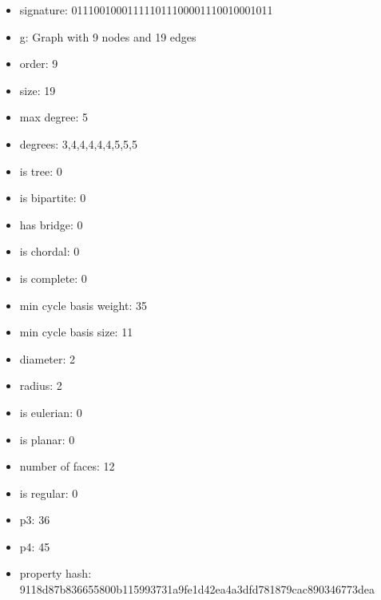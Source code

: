 \newpage
\begin{figure}
\end{figure}
\begin{itemize}
\item signature: 011100100011111011100001110010001011
\item g: Graph with 9 nodes and 19 edges
\item order: 9
\item size: 19
\item max degree: 5
\item degrees: 3,4,4,4,4,4,5,5,5
\item is tree: 0
\item is bipartite: 0
\item has bridge: 0
\item is chordal: 0
\item is complete: 0
\item min cycle basis weight: 35
\item min cycle basis size: 11
\item diameter: 2
\item radius: 2
\item is eulerian: 0
\item is planar: 0
\item number of faces: 12
\item is regular: 0
\item p3: 36
\item p4: 45
\item property hash: 9118d87b836655800b115993731a9fe1d42ea4a3dfd781879cac890346773dea
\end{itemize}
